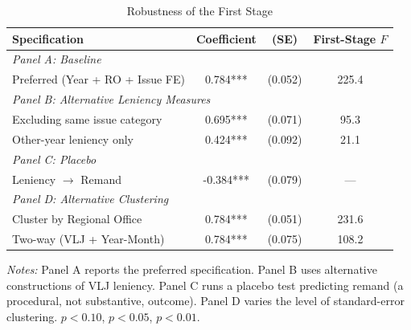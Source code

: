 
\begin{table}[H]
\centering
\caption{Robustness of the First Stage}
\begin{threeparttable}
\begin{tabular}{lccc}
\toprule
Specification & Coefficient & (SE) & First-Stage $F$ \\
\midrule
\multicolumn{4}{l}{\textit{Panel A: Baseline}} \\[0.3em]
Preferred (Year + RO + Issue FE) & 0.784*** & (0.052) & 225.4 \\[0.5em]
\multicolumn{4}{l}{\textit{Panel B: Alternative Leniency Measures}} \\[0.3em]
Excluding same issue category    & 0.695*** & (0.071) & 95.3 \\
Other-year leniency only         & 0.424*** & (0.092) & 21.1 \\[0.5em]
\multicolumn{4}{l}{\textit{Panel C: Placebo}} \\[0.3em]
Leniency $\rightarrow$ Remand   & -0.384*** & (0.079) & --- \\[0.5em]
\multicolumn{4}{l}{\textit{Panel D: Alternative Clustering}} \\[0.3em]
Cluster by Regional Office       & 0.784*** & (0.051) & 231.6 \\
Two-way (VLJ + Year-Month)       & 0.784*** & (0.075) & 108.2 \\
\bottomrule
\end{tabular}
\begin{tablenotes}[flushleft]
\small
\item \textit{Notes:} Panel A reports the preferred specification. Panel B uses alternative constructions of VLJ leniency. Panel C runs a placebo test predicting remand (a procedural, not substantive, outcome). Panel D varies the level of standard-error clustering. \sym{*} $p<0.10$, \sym{**} $p<0.05$, \sym{***} $p<0.01$.
\end{tablenotes}
\end{threeparttable}
\label{tab:robustness}
\end{table}
